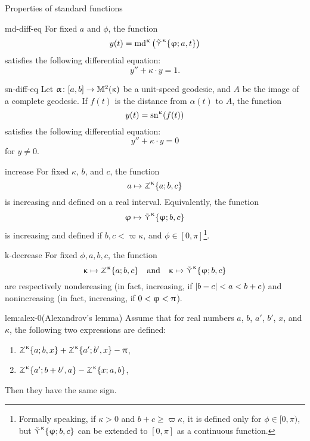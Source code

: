 \begin{thm}{Properties of standard functions}\label{md-equalities}

\begin{subthm}{md-diff-eq}
For fixed $a$ and $\phi$, the function 
\[y(t)=\mathrm{md}^{\upkappa}\left(\mathop{\tilde\curlyvee}\nolimits^{\upkappa}\{\upvarphi;a,t\}\right)\]
 satisfies the following differential equation:
\[y''+\kappa\cdot y=1.\]
\end{subthm}

\begin{subthm}{sn-diff-eq}
Let $\alpha\:[a,b]\to\Lob2\kappa$ be a unit-speed geodesic, and $A$ be the image of a complete geodesic.  If $f(t)$ is the distance from $\alpha(t)$ to $A$, the function 
\[y(t)=\mathrm{sn}^{\upkappa} (f(t))\]
 satisfies the following differential equation:
\[y''+\kappa\cdot y=0\]
for $y\ne 0$.
\end{subthm}

\begin{subthm}{increase}
For fixed $\kappa$, $b$, and $c$, the function 
\[a\mapsto\tangle\mc\kappa\{a;b,c\}\]
is increasing and defined on a real interval.
Equivalently, the function
\[\phi\mapsto\side\kappa \{\phi;b,c\}\]
is increasing and defined if $b,c<\varpi\kappa$, and $\phi\in[0,\pi]$\footnote{Formally speaking, if $\kappa>0$ and $b+c\ge \varpi\kappa$, it is defined only for $\phi\in[0,\pi)$, but $\mathop{\tilde\curlyvee}\nolimits^{\upkappa} \{\upvarphi;b,c\}$ can be extended to $[0,\pi]$ as a continuous function.}.
\end{subthm}

\begin{subthm}{k-decrease}
For fixed $\phi,a,b,c$, the function
\[\kappa\mapsto \tangle\mc\kappa\{a;b,c\}\quad \text{and}\quad \kappa\mapsto \side\kappa \{\phi;b,c\}\]
are respectively nondereasing (in fact, increasing, if $|b\z-c|\z<a\z< b+c$)
and nonincreasing (in fact, increasing, if $0\z<\phi\z<\pi$).
\end{subthm}

\begin{subthm}{lem:alex-0}(Alexandrov's lemma)
Assume that for real numbers $a$, $b$, $a'$, $b'$, $x$, and $\kappa$, the following two expressions are defined:
\begin{enumerate}
\item $\tangle\mc\kappa\{a;b,x\}+\tangle\mc\kappa\{a';b',x\}-\pi$,
\item $\tangle\mc\kappa\{a';b+b',a\}-\tangle\mc\kappa\{x;a,b\}$,
\end{enumerate}
Then they have the same sign.
\end{subthm}
\end{thm}

